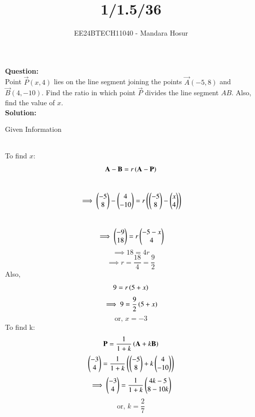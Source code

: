\documentclass[journal]{IEEEtran}
\begin{document}

\vspace{3cm}

\title{1/1.5/36}
\author{EE24BTECH11040 - Mandara Hosur}
{\let\newpage\relax\maketitle}

\renewcommand{\thefigure}{\theenumi}
\renewcommand{\thetable}{\theenumi}
\setlength{\intextsep}{10pt} %


\renewcommand{\thetable}{\theenumi}


\textbf{Question:}\\
Point $\vec{P}(x,4)$ lies on the line segment joining the points $\vec{A}(-5,8)$ and $\vec{B}(4,-10)$. Find the ratio in which point $\vec{P}$ divides the line segment $AB$. Also, find the value of $x$.
\\
\textbf{Solution:}
\begin{table}[h!]    
  \centering
  
  \caption{Given Information}
  \label{Table 1}
\end{table} \\
To find $x$: $$\mathbf{A}-\mathbf{B}=r\left(\mathbf{A}-\mathbf{P}\right)$$ \\
$$\implies \begin{pmatrix}-5\\8\end{pmatrix} - \begin{pmatrix}4\\-10\end{pmatrix} = r\left(\begin{pmatrix}-5\\8\end{pmatrix} - \begin{pmatrix}x\\4\end{pmatrix}\right)$$\\
$$\implies \begin{pmatrix}-9\\18\end{pmatrix} = r\begin{pmatrix}-5-x\\4\end{pmatrix}$$
$$\implies 18=4r$$
$$\implies r=\frac{18}{4}=\frac{9}{2}$$
Also, $$9=r\left(5+x\right)$$
$$\implies 9=\frac{9}{2}\left(5+x\right)$$
$$\text{or, }x=-3$$
To find k: $$\mathbf{P}=\frac{1}{1+k}\left(\mathbf{A}+k\mathbf{B}\right)$$
$$\begin{pmatrix}-3\\4\end{pmatrix}=\frac{1}{1+k}\left(\begin{pmatrix}-5\\8\end{pmatrix}+k\begin{pmatrix}4\\-10\end{pmatrix}\right)$$
$$\implies \begin{pmatrix}-3\\4\end{pmatrix}=\frac{1}{1+k}\begin{pmatrix}4k-5\\8-10k\end{pmatrix}$$
$$\text{or, }k=\frac{2}{7}$$
\end{document}
